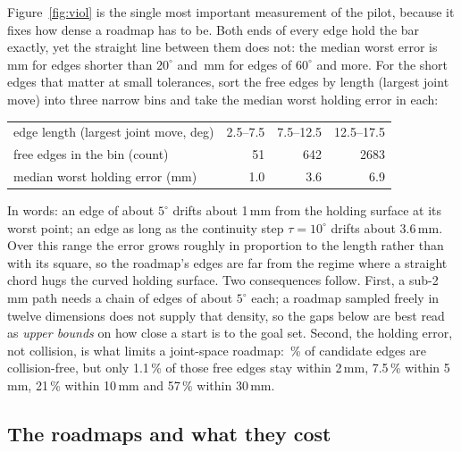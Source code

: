 Figure~\ref{fig:viol} is the single most important measurement of the pilot,
because it fixes how dense a roadmap has to be. Both ends of every edge hold the
bar exactly, yet the straight line between them does not: the median worst error
is \PrmMedianScoreShort\,mm for edges shorter than $20^\circ$ and
\PrmMedianScoreLong\,mm for edges of $60^\circ$ and more. For the short edges
that matter at small tolerances, sort the free edges by length (largest joint
move) into three narrow bins and take the median worst holding error in each:
\begin{center}
\footnotesize
\begin{tabular}{@{}lrrr@{}}
\toprule
edge length (largest joint move, deg) & 2.5--7.5 & 7.5--12.5 & 12.5--17.5 \\
free edges in the bin (count) & 51 & 642 & 2683 \\
median worst holding error (mm) & 1.0 & 3.6 & 6.9 \\
\bottomrule
\end{tabular}
\end{center}
In words: an edge of about $5^\circ$ drifts about 1\,mm from the holding surface
at its worst point; an edge as long as the continuity step $\tau = 10^\circ$
drifts about 3.6\,mm. Over this range the error grows roughly in proportion to the
length rather than with its square, so the roadmap's edges are far from the
regime where a straight chord hugs the curved holding surface. Two consequences
follow. First, a sub-2\,mm path needs a chain of edges of about $5^\circ$ each;
a roadmap sampled freely in twelve dimensions does not supply that density, so
the gaps below are best read as \emph{upper bounds} on how close a start is to
the goal set. Second, the holding error, not collision, is what limits a
joint-space roadmap: \PrmFreeEdgeShareLargest\,\% of candidate edges are
collision-free, but only 1.1\,\% of those free edges stay within 2\,mm, 7.5\,\%
within 5\,mm, 21\,\% within 10\,mm and 57\,\% within 30\,mm.

\subsection{The roadmaps and what they cost}

\begin{table}[h]
\centering
\footnotesize
\setlength{\tabcolsep}{3pt}
\caption{The four B18 roadmaps (goal-2 anchors, seed 0, 8 workers), one column
per node budget. A draw is one draw of the driving arm's six joints, followed by
one IK call for the other arm. A component is a set of nodes joined by
collision-free edges; the anchor rows say how many of the 7 goal anchors and the
73 start anchors sit in the largest one.}
\label{tab:build}

\end{table}


